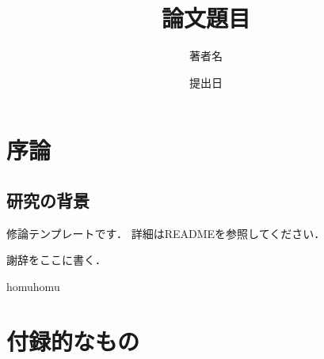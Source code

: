 \documentclass[a4j,12pt,report]{jsbook}
\title{論文題目} %
\author{著者名} %
\date{提出日} %
\begin{document}
\maketitle

\clearpage

\setcounter{page}{1}
\tableofcontents
\newpage

\chapter{序論}
\section{研究の背景}
修論テンプレート\cite{template}です．
詳細はREADMEを参照してください．

謝辞をここに書く．




\begin{relatedworks}{9}
  homuhomu
\end{relatedworks}

\appendix
\chapter{付録的なもの}
\end{document}
